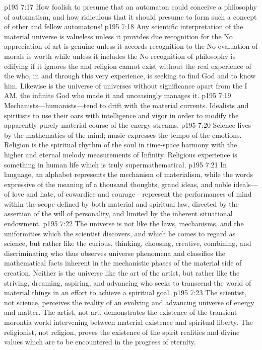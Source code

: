 \pc \vs p195 7:17 How foolish to presume that an automaton could conceive a philosophy of automatism, and how ridiculous that it should presume to form such a concept of other and fellow automatons!
\pc \vs p195 7:18 Any scientific interpretation of the material universe is valueless unless it provides due recognition for the  No appreciation of art is genuine unless it accords recognition to the  No evaluation of morals is worth while unless it includes the  No recognition of philosophy is edifying if it ignores the  and religion cannot exist without the real experience of the  who, in and through this very experience, is seeking to find God and to know him. Likewise is the universe of universes without significance apart from the I AM, the infinite God who made it and unceasingly manages it.\plusone
\pc \vs p195 7:19 Mechanists---humanists---tend to drift with the material currents. Idealists and spiritists  to use their oars with intelligence and vigor in order to modify the apparently purely material course of the energy streams.
\pc \vs p195 7:20 Science lives by the mathematics of the mind; music expresses the tempo of the emotions. Religion is the spiritual rhythm of the soul in time\hyp{}space harmony with the higher and eternal melody measurements of Infinity. Religious experience is something in human life which is truly supermathematical.
\vs p195 7:21 In language, an alphabet represents the mechanism of materialism, while the words expressive of the meaning of a thousand thoughts, grand ideas, and noble ideals---of love and hate, of cowardice and courage---represent the performances of mind within the scope defined by both material and spiritual law, directed by the assertion of the will of personality, and limited by the inherent situational endowment.
\vs p195 7:22 The universe is not like the laws, mechanisms, and the uniformities which the scientist discovers, and which he comes to regard as science, but rather like the curious, thinking, choosing, creative, combining, and discriminating  who thus observes universe phenomena and classifies the mathematical facts inherent in the mechanistic phases of the material side of creation. Neither is the universe like the art of the artist, but rather like the striving, dreaming, aspiring, and advancing  who seeks to transcend the world of material things in an effort to achieve a spiritual goal.
\vs p195 7:23 The scientist, not science, perceives the reality of an evolving and advancing universe of energy and matter. The artist, not art, demonstrates the existence of the transient morontia world intervening between material existence and spiritual liberty. The religionist, not religion, proves the existence of the spirit realities and divine values which are to be encountered in the progress of eternity.
